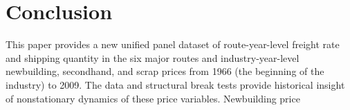 \documentclass[11pt]{article}
\begin{document}
\section{Conclusion}\label{sec:conclusion}
This paper provides a new unified panel dataset of route-year-level freight rate and shipping quantity in the six major routes and industry-year-level newbuilding, secondhand, and scrap prices from 1966 (the beginning of the industry) to 2009. The data and structural break tests provide historical insight of nonstationary dynamics of these price variables. Newbuilding price


\appendix

% 
% 


\newpage


\end{document}
